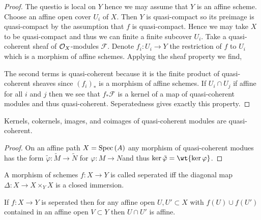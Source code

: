 \documentclass[12pt]{article}
\begin{document}
\begin{proof}
The questio is local on $Y$ hence we may assume that $Y$ is an affine scheme. Choose an affine open cover $U_i$ of $X$. Then $Y$ is quasi-compact so its preimage is quasi-compact by the assumption that $f$ is quasi-compact. Hence we may take $X$ to be quasi-compact and thus we can finite a finite subcover $U_i$. Take a quasi-coherent sheaf of $\mathcal{O}_{X}$-modules $\mathcal{F}$. Denote $f_i : U_i \to Y$ the restriction of $f$ to $U_i$ which is a morphism of affine schemes. Applying the sheaf property we find,
\begin{center}
\end{center}
The second terms is quasi-coherent because it is the finite product of quasi-coherent sheaves since $(f_i)_*$ is a morphism of affine schemes. If $U_i \cap U_j$ if affine for all $i$ and $j$ then we see that $f_* \mathcal{F}$ is a kernel of a map of quasi-coherent modules and thus quasi-coherent. Seperatedness gives exactly this property. 
\end{proof}

\begin{lemma}
Kernels, cokernels, images, and coimages of quasi-coherent modules are quasi-coherent.
\end{lemma}

\begin{proof}
On an affine path $X = \mathrm{Spec}\left( A \right)$ any morphism of quasi-coherent modues has the form $\tilde{\varphi} : \tilde{M} \to \tilde{N}$ for $\varphi : M \to N$and thus $\ker{\tilde{\varphi}} = \wt{\ker{\varphi}}$. 
\end{proof}

\begin{definition}
A morphism of schemes $f : X \to Y$ is called seperated iff the diagonal map $\Delta : X \to X \times_Y X$ is a closed immersion.  
\end{definition}

\begin{lemma}
If $f : X \to Y$ is seperated then for any affine open $U, U' \subset X$ with $f(U) \cup f(U')$ contained in an affine open $V \subset Y$ then $U \cap U'$ is affine. 
\end{lemma}
\end{document}
